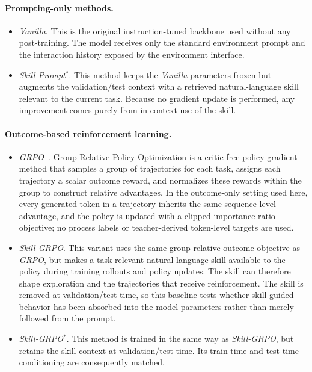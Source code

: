 \paragraph{Prompting-only methods.}
\begin{itemize}
    \item \textit{Vanilla}. This is the original instruction-tuned backbone used without any post-training. The model receives only the standard environment prompt and the interaction history exposed by the environment interface. 
    \item \textit{Skill-Prompt}$^{*}$. This method keeps the \textit{Vanilla} parameters frozen but augments the validation/test context with a retrieved natural-language skill relevant to the current task. Because no gradient update is performed, any improvement comes purely from in-context use of the skill. 
\end{itemize}

\paragraph{Outcome-based reinforcement learning.}
\begin{itemize}
    \item \textit{GRPO}~\citep{shao2024deepseekmath}. Group Relative Policy Optimization is a critic-free policy-gradient method that samples a group of trajectories for each task, assigns each trajectory a scalar outcome reward, and normalizes these rewards within the group to construct relative advantages. In the outcome-only setting used here, every generated token in a trajectory inherits the same sequence-level advantage, and the policy is updated with a clipped importance-ratio objective; no process labels or teacher-derived token-level targets are used. 

    \item \textit{Skill-GRPO}. This variant uses the same group-relative outcome objective as \textit{GRPO}, but makes a task-relevant natural-language skill available to the policy during training rollouts and policy updates. The skill can therefore shape exploration and the trajectories that receive reinforcement. The skill is removed at validation/test time, so this baseline tests whether skill-guided behavior has been absorbed into the model parameters rather than merely followed from the prompt.

    \item \textit{Skill-GRPO}$^{*}$. This method is trained in the same way as \textit{Skill-GRPO}, but retains the skill context at validation/test time. Its train-time and test-time conditioning are consequently matched. 
\end{itemize}

